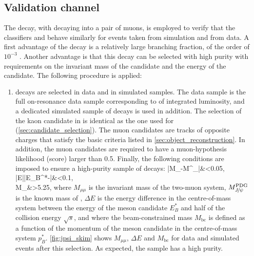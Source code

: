 \subsection{Validation channel} \label{sec:jpsi}
The \BKjpsi decay, with \jpsi decaying into a pair of muons, is employed to verify that the classifiers \bdto and \bdtt behave similarly for events taken from simulation and from data.
A first advantage of the \BKjpsi decay is a relatively large branching fraction, of the order of $10^{-3}$ \cite{ParticleDataGroup:2020ssz}.
Another advantage is that this decay can be selected with high purity with requirements on the invariant mass of the \jpsi candidate and the energy of the \B candidate.
The following procedure is applied:
\begin{enumerate}
\item \label{jpsi_step_1} \BKjpsimumu decays are selected in data and in simulated samples.
The data sample is the full on-resonance data sample corresponding to \lumion of integrated luminosity, and a dedicated simulated sample of \BKjpsi decays is used in addition.
The selection of the kaon candidate in \BKjpsimumu is identical as the one used for \BKnn (\cref{sec:candidate_selection}).
The muon candidates are tracks of opposite charges that satisfy the basic criteria listed in \cref{sec:object_reconstruction}.
In addition, the muon candidates are required to have a muon-hypothesis likelihood (\PID score) larger than 0.5.
Finally, the following conditions are imposed to ensure a high-purity sample of \BKjpsi decays:
\ba
\left|M_{\mu\mu}-M^{}_{\jpsi}\right|&<0.05\gevcc, \\
|\Delta E|\equiv\left|E_B^*-\right|&<0.1\gev, \\
M_{}\equiv{}&>5.25\gevcc,
\ea
where $M_{\mu\mu}$ is the invariant mass of the two-muon system, $M^{\mathrm{PDG}}_{{J\mskip -3mu/\mskip -2mu\psi\mskip 2mu}}$ is the known mass of \jpsi \cite{ParticleDataGroup:2020ssz}, $\Delta E$ is the energy difference in the centre-of-mass system between the energy of the \B meson candidate $E_B^*$ and half of the collision energy $\sqrt{s}$, and where the beam-constrained mass $M_{\mathrm{bc}}$ is defined as a function of the momentum of the \B meson candidate in the centre-of-mass system $p^*_B$. \cref{fig:jpsi_skim} shows $M_{\mu\mu}$, $\Delta E$ and $M_{\mathrm{bc}}$ for data and simulated events after this selection.
As expected, the sample has a high purity.


\end{enumerate}
